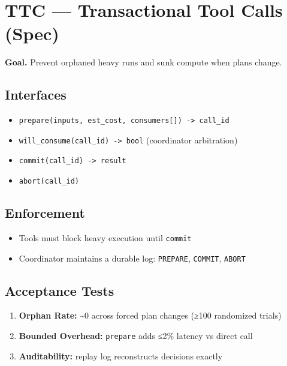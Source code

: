 \documentclass[
]{article}
\author{}
\date{}
\providecommand{\tightlist}{%
  \setlength{\itemsep}{0pt}\setlength{\parskip}{0pt}}
\begin{document}
\hypertarget{ttc-transactional-tool-calls-spec}{%
\section{TTC --- Transactional Tool Calls
(Spec)}\label{ttc-transactional-tool-calls-spec}}

\textbf{Goal.} Prevent orphaned heavy runs and sunk compute when plans
change.

\hypertarget{interfaces}{%
\subsection{Interfaces}\label{interfaces}}

\begin{itemize}
\tightlist
\item
  \texttt{prepare(inputs,\ est\_cost,\ consumers{[}{]})\ -\textgreater{}\ call\_id}
\item
  \texttt{will\_consume(call\_id)\ -\textgreater{}\ bool} (coordinator
  arbitration)
\item
  \texttt{commit(call\_id)\ -\textgreater{}\ result}
\item
  \texttt{abort(call\_id)}
\end{itemize}

\hypertarget{enforcement}{%
\subsection{Enforcement}\label{enforcement}}

\begin{itemize}
\tightlist
\item
  Tools must block heavy execution until \texttt{commit}
\item
  Coordinator maintains a durable log: \texttt{PREPARE},
  \texttt{COMMIT}, \texttt{ABORT}
\end{itemize}

\hypertarget{acceptance-tests}{%
\subsection{Acceptance Tests}\label{acceptance-tests}}

\begin{enumerate}
\def\labelenumi{\arabic{enumi}.}
\tightlist
\item
  \textbf{Orphan Rate:} \textasciitilde0 across forced plan changes
  (≥100 randomized trials)
\item
  \textbf{Bounded Overhead:} \texttt{prepare} adds ≤2\% latency vs
  direct call
\item
  \textbf{Auditability:} replay log reconstructs decisions exactly
\end{enumerate}
\end{document}
